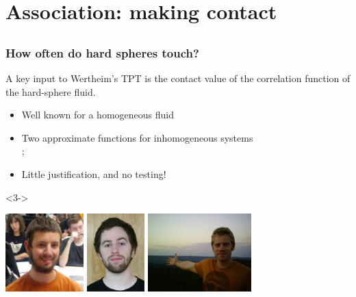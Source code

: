 \section{Association:  making contact}
\subsection*{}

\begin{frame}
  \frametitle{How often do hard spheres touch?}  A key input to
  Wertheim's TPT is the contact value of the correlation function of
  the hard-sphere fluid.
  \begin{itemize}
  \item<2-> Well known for a homogeneous fluid
  \item<2-> Two approximate functions for inhomogeneous systems
    \\ \hfill {}\tiny ;
  \item<2-> Little justification, and no testing!
  \end{itemize}
  \begin{block}{}<3->
  \begin{center}
    \includegraphics[height=3cm]{figs/HaglundChris}
    \includegraphics[height=3cm]{figs/KreitzbergPatrick}
    \includegraphics[height=3cm]{figs/SchulteJeff}
  \end{center}
  \end{block}
\end{frame}

